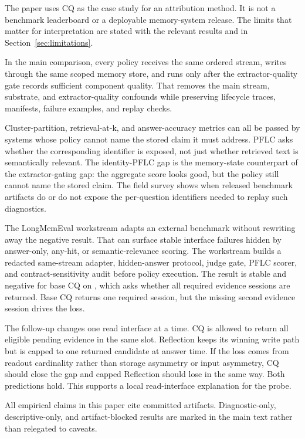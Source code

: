 The paper uses CQ as the case study for an attribution method. It is not a
benchmark leaderboard or a deployable memory-system release. The limits that
matter for interpretation are stated with the relevant results and in
Section~\ref{sec:limitations}.

In the main comparison, every policy receives the same ordered
 stream, writes through the same scoped memory store, and
runs only after the extractor-quality gate records sufficient component
quality. That removes the main stream, substrate, and extractor-quality
confounds while preserving lifecycle traces, manifests, failure examples, and
replay checks.

Cluster-partition, retrieval-at-k, and answer-accuracy metrics can all be
passed by systems whose policy cannot name the stored claim it must address.
PFLC asks whether the corresponding identifier is exposed, not just whether
retrieved text is semantically relevant.
The identity-PFLC gap is the memory-state counterpart of the extractor-gating
gap: the aggregate score looks good, but the policy still cannot name the
stored claim. The field survey shows when released benchmark artifacts do or do
not expose the per-question identifiers needed to replay such diagnostics.

The LongMemEval workstream adapts an external benchmark without rewriting away
the negative result. That can surface stable interface failures hidden by
answer-only, any-hit, or semantic-relevance scoring. The workstream builds a
redacted same-stream adapter, hidden-answer protocol, judge gate, PFLC scorer,
and contract-sensitivity audit before policy execution. The result is stable
and negative for base CQ on , which asks whether all
required evidence sessions are returned. Base CQ returns one required session,
but the missing second evidence session drives the loss.

The follow-up changes one read interface at a time. CQ is allowed to return all
eligible pending evidence in the same slot. Reflection keeps its winning write
path but is capped to one returned candidate at answer time. If the loss comes
from readout cardinality rather than storage asymmetry or input asymmetry, CQ
should close the gap and capped Reflection should lose in the same way. Both
predictions hold. This supports a local read-interface explanation for the
probe.



All empirical claims in this paper cite committed artifacts. Diagnostic-only,
descriptive-only, and artifact-blocked results are marked in the main text
rather than relegated to caveats.
